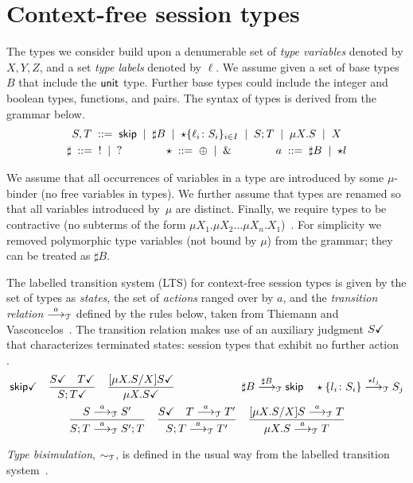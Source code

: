 \section{Context-free session types}
\label{sec:contextfreesession}

The types we consider build upon a denumerable set of \emph{type
  variables} denoted by $X,Y,Z$, and a set \emph{type labels} denoted
by $\ell$. We assume given a set of base types $B$ that include the
$\unitk$ type. Further base types could include the integer and
boolean types, functions, and pairs. The syntax of types is derived
from the grammar below.
%
\begin{gather*}
  S,T \grmeq \skipk \grmor \sharp B \grmor 
  \star\{\ell_i\colon S_i\}_{i\in I} \grmor S;T \grmor \mu X.S \grmor X
  \\
  \sharp \grmeq {}! \grmor {}? 
  \qquad \qquad
  \star  \grmeq \oplus \grmor {}\&
  \qquad \qquad
  a \grmeq \sharp B \grmor \star l %
\end{gather*}

We assume that all occurrences of variables in a type are introduced
by some $\mu$-binder (no free variables in types).
%
We further assume that types are renamed so that all variables
introduced by~$\mu$ are distinct.
%
Finally, we require types to be contractive (no subterms of the form
$\mu X_1.\mu X_2 \dots \mu
X_n. X_1$)~\cite{DBLP:journals/tcs/Courcelle83,thiemann2016context}.
%
For simplicity we removed polymorphic type variables (not bound by
$\mu$) from the grammar; they can be treated as $\sharp B$.

The labelled transition system (LTS) for context-free session types is
given by the set of types as \emph{states}, the set of \emph{actions}
ranged over by $a$, and the \emph{transition relation} $\LTSderives$
defined by the rules below, taken from Thiemann and
Vasconcelos~\cite{thiemann2016context}.  The transition relation makes
use of an auxiliary judgment $\DONE{S}$ that characterizes terminated
states: session types that exhibit no further
action~\cite{DBLP:journals/jacm/AcetoH92} .
%
\begin{gather*}
  \DONE{\skipk}
  \quad
  \frac{\DONE{S} \quad \DONE{T}}{\DONE{S; T}}
  \quad
  \frac{\DONE{\subs{\mu X.S}{X} S}}{\DONE{\mu X.S}}
  \qquad \qquad \qquad
  \sharp B \LTSderives[\sharp B] \skipk
  \quad
  \star\{l_i\colon S_i\} \LTSderives[\star l_j] S_j
  \\
  \frac{S \LTSderives S'}{S; T \LTSderives S';T}
  \quad
  \frac{\DONE{S} \quad T \LTSderives T'}{S; T \LTSderives T'}
  \quad
  \frac{\subs{\mu X.S}{X}S \LTSderives T}{\mu X.S \LTSderives T}
\end{gather*}

\emph{Type bisimulation}, $\TypeEquiv$, is defined in the usual way from the
labelled transition system~\cite{sangiorgi2014introduction}.
\
